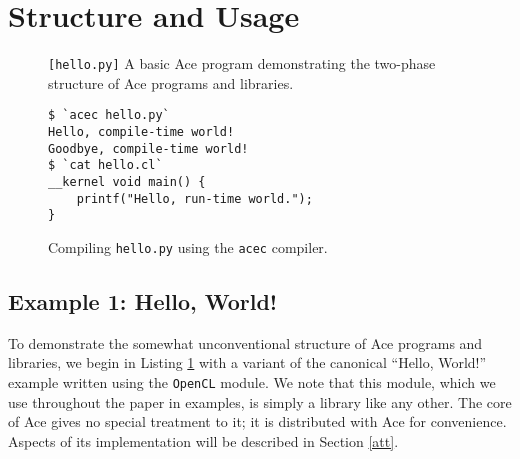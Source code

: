 \documentclass[10pt]{sigplanconf}
\begin{document}
\section{Structure and Usage}
\begin{figure}

\caption{\texttt{[hello.py]} A basic Ace program demonstrating the two-phase structure of Ace programs and libraries.}
\label{hello}
\end{figure}
\begin{figure}
\begin{lstlisting}[style=Bash]
$ `acec hello.py`
Hello, compile-time world!
Goodbye, compile-time world!
$ `cat hello.cl`
__kernel void main() {
    printf("Hello, run-time world.");
}\end{lstlisting}
\caption{Compiling \texttt{hello.py} using the \texttt{acec} compiler.}
\label{helloout}
\end{figure}

\subsection{Example 1: Hello, World!}
To demonstrate the somewhat unconventional structure of Ace programs and libraries, we begin in Listing \ref{hello} with a variant of the canonical ``Hello, World!'' example written using the \verb|OpenCL| module. We note that this module, which we use throughout the paper in examples, is simply a library like any other. The core of Ace gives no special treatment to it; it is distributed with Ace for convenience. Aspects of its implementation will be described in Section \ref{att}.
\end{document}
